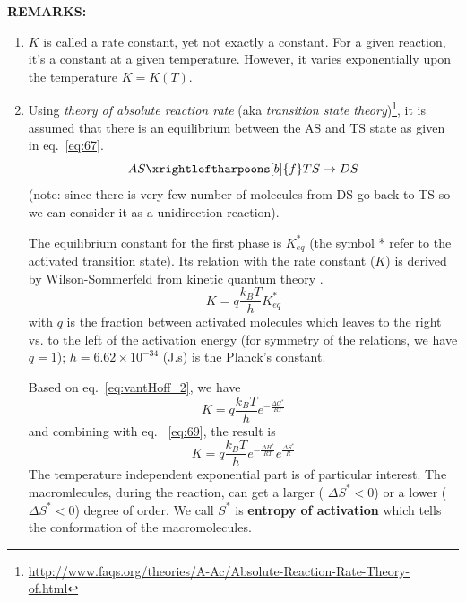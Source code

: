 {\bf REMARKS:}
\begin{enumerate}
\item $K$ is called a rate constant, yet not exactly a constant. For a
  given reaction,  it's a constant at a given temperature. However, it
  varies exponentially upon the temperature $K=K(T)$.

\item Using {\it theory of absolute reaction rate} (aka {\it transition
    state
    theory})\footnote{\url{http://www.faqs.org/theories/A-Ac/Absolute-Reaction-Rate-Theory-of.html}},
  it is assumed that there is an equilibrium between the AS and TS
  state as given in eq.~\eqref{eq:67}. 
\begin{equation}
  \label{eq:67}
  AS
  \xrightleftharpoons[b]{f} TS \rightarrow DS  
\end{equation}
(note: since there is very few number of molecules from DS go back to
TS so we can consider it as a unidirection reaction).

The equilibrium constant for the first phase is $K^*_{eq}$ (the symbol
* refer to the activated transition state).  Its relation with the
rate constant ($K$) is derived by Wilson-Sommerfeld from kinetic
quantum theory \citep{glaser2001biophysics}.
  \begin{equation}
    \label{eq:WilsonSommerfeld}
    K = q \frac{k_BT}{h}K^*_{eq}
  \end{equation}
  with $q$ is the fraction between activated molecules which leaves to
  the right vs. to the left of the activation energy (for symmetry of
  the relations, we have $q=1$); $h = 6.62\times 10^{-34}$ (J.s) is the
  Planck's constant.

  Based on eq.~\eqref{eq:vantHoff_2}, we have
  \begin{equation}
    K = q \frac{k_BT}{h}e^{-\frac{\Delta G^*}{RT}}
  \end{equation}
and combining with eq. ~\eqref{eq:69}, the result is
  \begin{equation}
    K = q \frac{k_BT}{h}e^{-\frac{\Delta H^*}{RT}}e^{\frac{\Delta S^*}{R}}
  \end{equation}
  The temperature independent exponential part is of particular
  interest. The macromlecules, during the reaction, can get a larger (
  $\Delta S^* < 0$) or a lower ($\Delta S^* < 0$) degree of order. We
  call $ S^*$ is {\bf entropy of activation} which tells the
  conformation of the macromolecules.


\end{enumerate}
